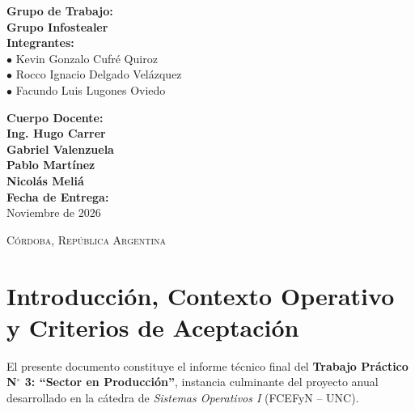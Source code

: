\documentclass[10pt,a4paper]{article}
\begin{document}
\begin{titlepage}
    \begin{minipage}{0.54\textwidth}
        \begin{flushleft} \normalsize
            \textbf{\color{uncblue}Grupo de Trabajo:}\\[0.15cm]
            \textbf{Grupo Infostealer}\\[0.3cm]
            \textbf{\color{uncblue}Integrantes:}\\[0.15cm]
            $\bullet$ Kevin Gonzalo Cufré Quiroz\\
            $\bullet$ Rocco Ignacio Delgado Velázquez\\
            $\bullet$ Facundo Luis Lugones Oviedo
        \end{flushleft}
    \end{minipage}
    \hfill
    \begin{minipage}{0.42\textwidth}
        \begin{flushright} \normalsize
            \textbf{\color{uncblue}Cuerpo Docente:}\\[0.15cm]
            \textbf{Ing. Hugo Carrer}\\
            \textbf{Gabriel Valenzuela}\\
            \textbf{Pablo Martínez}\\
            \textbf{Nicolás Meliá}\\[0.3cm]
            \textbf{\color{uncblue}Fecha de Entrega:}\\[0.15cm]
            Noviembre de 2026
        \end{flushright}
    \end{minipage}
    
    \vfill
    \vspace{0.5cm}
    {\footnotesize\scshape Córdoba, República Argentina}
\end{titlepage}

\hypersetup{pageanchor=true}

\setcounter{section}{-1}
\section{Introducción, Contexto Operativo y Criterios de Aceptación}

El presente documento constituye el informe técnico final del \textbf{Trabajo Práctico N$^\circ$ 3: “Sector en Producción”}, instancia culminante del proyecto anual desarrollado en la cátedra de \textit{Sistemas Operativos I} (FCEFyN -- UNC).
\end{document}
